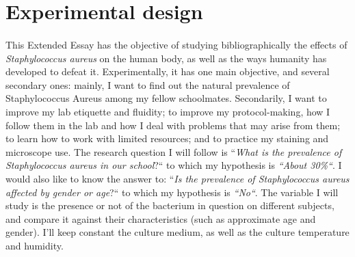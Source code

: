 \section{Experimental design}
\paragraph{}This Extended Essay has the objective of studying bibliographically the effects of \emph{Staphylococcus aureus} on the human body, as well as the ways humanity has developed to defeat it. Experimentally, it has one main objective, and several secondary ones: mainly, I want to find out the natural prevalence of Staphylococcus Aureus among my fellow schoolmates. Secondarily, I want to improve my lab etiquette and fluidity; to improve my protocol-making, how I follow them in the lab and how I deal with problems that may arise from them; to learn how to work with limited resources; and to practice my staining and microscope use. The research question I will follow is ``\emph{What is the prevalence of \emph{Staphylococcus aureus} in our school}?`` to which my hypothesis is \emph{``About 30\%``}. I would also like to know the answer to: ``\emph{Is the prevalence of \emph{Staphylococcus aureus} affected by gender or age}?`` to which my hypothesis is \emph{``No``}.  The variable I will study is the presence or not of the bacterium in question on different subjects, and compare it against their characteristics (such as approximate age and gender). I'll keep constant the culture medium, as well as the culture temperature and humidity. 
